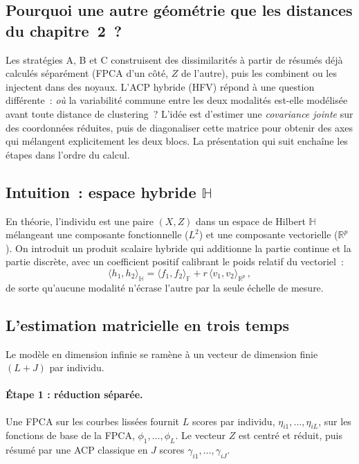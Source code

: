\documentclass[11pt,a4paper]{article}
\begin{document}
\subsection{Pourquoi une autre géométrie que les distances du chapitre~2~?}
Les stratégies A, B et C construisent des dissimilarités à partir de résumés
déjà calculés séparément (FPCA d'un côté, $Z$ de l'autre), puis les combinent
ou les injectent dans des noyaux. L'ACP hybride (HFV) répond à une question
différente~: \emph{où} la variabilité commune entre les deux modalités est-elle
modélisée avant toute distance de clustering~? L'idée est d'estimer une
\emph{covariance jointe} sur des coordonnées réduites, puis de diagonaliser
cette matrice pour obtenir des axes qui mélangent explicitement les deux
blocs. La présentation qui suit enchaîne les étapes dans l'ordre du calcul.

\subsection{Intuition~: espace hybride $\mathbb{H}$}
En théorie, l'individu est une paire $(X,Z)$ dans un espace de Hilbert
$\mathbb{H}$ mélangeant une composante fonctionnelle ($L^2$) et une composante
vectorielle ($\mathbb{R}^p$). On introduit un produit scalaire hybride qui
additionne la partie continue et la partie discrète, avec un coefficient
positif calibrant le poids relatif du vectoriel~:
\begin{equation}
  \label{eq:prodscalaire_hybride}
  \langle h_1, h_2 \rangle_{\mathbb{H}}
  = \langle f_1, f_2 \rangle_{\mathbb{F}}
  + r\,\langle v_1, v_2 \rangle_{\mathbb{R}^p}\,,
\end{equation}
de sorte qu'aucune modalité n'écrase l'autre par la seule échelle de mesure.

\subsection{L'estimation matricielle en trois temps}
Le modèle en dimension infinie se ramène à un vecteur de dimension finie
$(L{+}J)$ par individu.

\paragraph{Étape 1 : réduction séparée.}
Une FPCA sur les courbes lissées fournit $L$ scores par individu,
$\eta_{i1},\ldots,\eta_{iL}$, sur les fonctions de base de la FPCA,
$\phi_1,\ldots,\phi_L$. Le vecteur $Z$ est centré et réduit, puis résumé par une
ACP classique en $J$ scores
$\gamma_{i1},\ldots,\gamma_{iJ}$.
\end{document}
